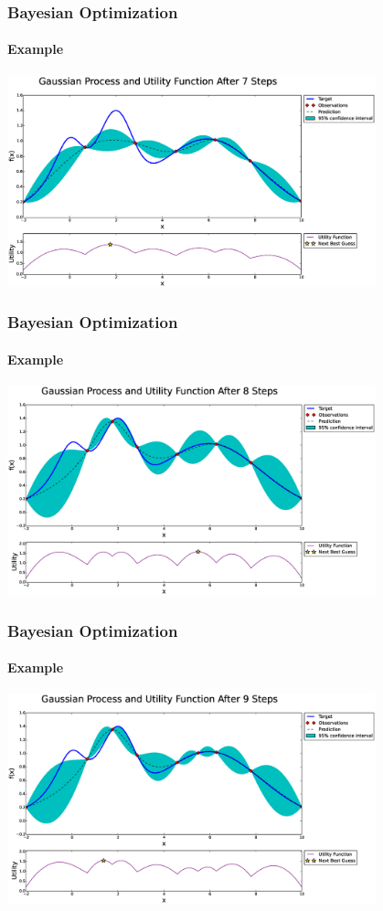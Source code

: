 \begin{frame}
	\frametitle{Bayesian Optimization}
	\framesubtitle{Example}
	
	\centering
	\includegraphics[width=0.8\textwidth]{figures/bayesian-optimization/fig5}
	
\end{frame}

\begin{frame}
	\frametitle{Bayesian Optimization}
	\framesubtitle{Example}
	
	\centering
	\includegraphics[width=0.8\textwidth]{figures/bayesian-optimization/fig6}
	
\end{frame}

\begin{frame}
	\frametitle{Bayesian Optimization}
	\framesubtitle{Example}
	
	\centering
	\includegraphics[width=0.8\textwidth]{figures/bayesian-optimization/fig7}
	
\end{frame}